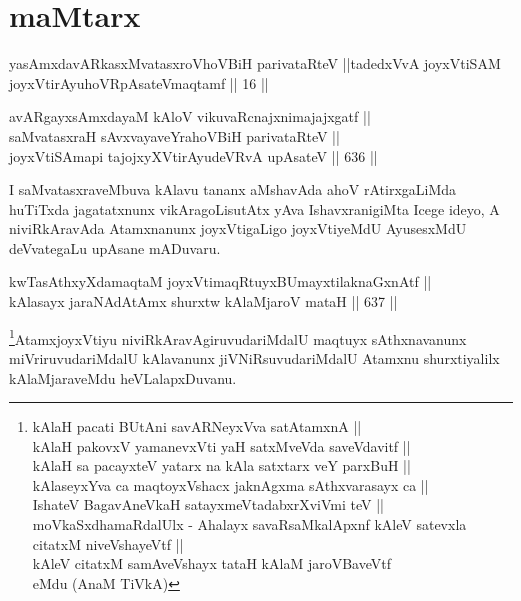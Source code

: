 
\section*{maMtarx}

\begin{shl}
yasAmxdavARkasxMvatasxroV\s hoVBiH parivataRteV ||tadedxVvA joyxVtiSAM joyxVtirAyuhoVRpAsateV\s maqtamf || 16 ||
\end{shl}


\begin{shl}
avARgayxsAmxdayaM kAloV vikuvaRcnajxnimajajxgatf || \\
saMvatasxraH sAvxvayaveYrahoVBiH parivataRteV || \\
\footnotemark[1]joyxVtiSAmapi tajojxyXVtirAyudeVRvA upAsateV \hfill || 636 ||  
\end{shl}

\begin{artha}
I saMvatasxraveMbuva kAlavu tananx aMshavAda ahoV
rAtirxgaLiMda huTiTxda jagatatxnunx vikAragoLisutAtx yAva
IshavxranigiMta Icege ideyo, A niviRkAravAda Atamxnanunx joyxVtigaLigo
joyxVtiyeMdU AyusesxMdU deVvategaLu upAsane mADuvaru.
\end{artha}



\begin{shl}
kwTasAthxyXdamaqtaM joyxVtimaqRtuyxBUmayxtilaknaGxnAtf ||  \\
kAlasayx jaraNAdAtAmx shurxtw kAlaMjaroV mataH \hfill || 637 ||  
\end{shl}

\begin{artha}
\footnote{kAlaH pacati BUtAni savARNeyxVva satA\s \s tamxnA ||\\
kAlaH pakovxV yamanevxVti yaH satxMveVda saveVdavitf ||\\
kAlaH sa pacayxteV yatarx na kAla satxtarx veY parxBuH ||\\
kAlaseyxYva ca maqtoyxVshacx jaknAgxma sAthxvarasayx ca ||\\
IshateV BagavAneVkaH satayxmeVtadabxrXviVmi teV || moVkaSxdhamaRdalUlx - Ahalayx savaRsaMkalApxnf kAleV satevxla citatxM niveVshayeVtf ||\\
kAleV citatxM samAveVshayx tataH kAlaM jaroVBaveVtf \\
 eMdu (AnaM TiVkA)}AtamxjoyxVtiyu niviRkAravAgiruvudariMdalU maqtuyx
sAthxnavanunx miVriruvudariMdalU kAlavanunx jiVNiRsuvudariMdalU
Atamxnu shurxtiyalilx kAlaMjaraveMdu heVLalapxDuvanu.
\end{artha}

